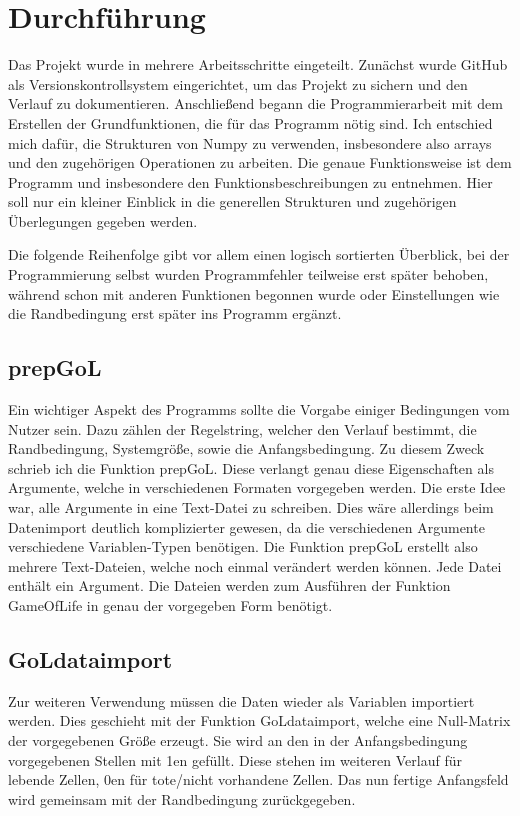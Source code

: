 \documentclass{scrartcl}
\begin{document}
\section{Durchführung}
Das Projekt wurde in mehrere Arbeitsschritte eingeteilt. Zunächst wurde GitHub als Versionskontrollsystem eingerichtet, um das Projekt zu sichern und den Verlauf zu dokumentieren. Anschließend begann die Programmierarbeit mit dem Erstellen der Grundfunktionen, die für das Programm nötig sind. Ich entschied mich dafür, die Strukturen von Numpy zu verwenden, insbesondere also arrays und den zugehörigen Operationen zu arbeiten. Die genaue Funktionsweise ist dem Programm und insbesondere den Funktionsbeschreibungen zu entnehmen. Hier soll nur ein kleiner Einblick in die generellen Strukturen und zugehörigen Überlegungen gegeben werden.

Die folgende Reihenfolge gibt vor allem einen logisch sortierten Überblick, bei der Programmierung selbst wurden Programmfehler teilweise erst später behoben, während schon mit anderen Funktionen begonnen wurde oder Einstellungen wie die Randbedingung erst später ins Programm ergänzt.
\subsection{prepGoL}
Ein wichtiger Aspekt des Programms sollte die Vorgabe einiger Bedingungen vom Nutzer sein. Dazu zählen der Regelstring, welcher den Verlauf bestimmt, die Randbedingung, Systemgröße, sowie die Anfangsbedingung. Zu diesem Zweck schrieb ich die Funktion prepGoL. Diese verlangt genau diese Eigenschaften als Argumente, welche in verschiedenen Formaten vorgegeben werden. Die erste Idee war, alle Argumente in eine Text-Datei zu schreiben. Dies wäre allerdings beim Datenimport deutlich komplizierter gewesen, da die verschiedenen Argumente verschiedene Variablen-Typen benötigen. Die Funktion prepGoL erstellt also mehrere Text-Dateien, welche noch einmal verändert werden können. Jede Datei enthält ein Argument. Die Dateien werden zum Ausführen der Funktion GameOfLife in genau der vorgegeben Form benötigt.
\subsection{GoLdataimport}
Zur weiteren Verwendung müssen die Daten wieder als Variablen importiert werden. Dies geschieht mit der Funktion GoLdataimport, welche eine Null-Matrix der vorgegebenen Größe erzeugt. Sie wird an den in der Anfangsbedingung vorgegebenen Stellen mit 1en gefüllt. Diese stehen im weiteren Verlauf für lebende Zellen, 0en für tote/nicht vorhandene Zellen. Das nun fertige Anfangsfeld wird gemeinsam mit der Randbedingung zurückgegeben.
\end{document}
